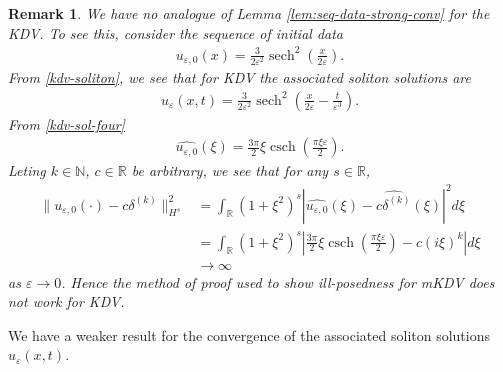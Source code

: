\documentclass[12pt,reqno]{amsart}
\numberwithin{equation}{section}  %
\newcommand{\rr}{\mathbb{R}}
\newcommand{\wh}{\widehat}
\newcommand{\ee}{\varepsilon}
\DeclareMathOperator{\sech}{sech}
\DeclareMathOperator{\csch}{csch}
\newtheorem{remark}[theorem]{Remark}
\begin{document}
\begin{framed}
  \begin{remark}
    We have no analogue of Lemma \ref{lem:seq-data-strong-conv} for the KDV. To
    see this, consider the sequence of initial data 
    \begin{equation*}
    \begin{split}
      u_{\ee,0}(x) = \frac{3}{2\ee^{2}}\sech^{2}\left(
      \frac{x}{2 \ee} \right).
    \end{split}
    \end{equation*}
    From \eqref{kdv-soliton}, we see that for KDV the associated soliton
    solutions are
    \begin{equation*}
    \begin{split}
      u_{\ee}(x,t) = \frac{3}{2\ee^{2}}
      \sech^{2}\left( \frac{x}{2 \ee} - \frac{t}{\ee^{3}}
        \right).
    \end{split}
    \end{equation*}
    From \eqref{kdv-sol-four}
    \begin{equation*}
    \begin{split}
      \wh{u_{\ee, 0}}(\xi) = \frac{3 \pi}{2} \xi \csch\left( \frac{\pi \xi
      \ee}{2} \right).
    \end{split}
    \end{equation*}
    Leting
    $k \in \mathbb{N}$, $c \in \rr$ be arbitrary, we see that for any $s \in \rr$,
    \begin{equation*}
    \begin{split}
      \| u_{\ee,0}(\cdot) - c \delta^{(k)} \|_{H^{s}}^{2}
      & = \int_{\rr}
      (1 + \xi^{2})^{s} | \wh{u_{\ee,0}}(\xi) - \wh{c \delta^{(k)}}(\xi)
      |^{2} d \xi
      \\
      & =  \int_{\rr} (1 + \xi^{2})^{s} | \frac{3 \pi}{2} \xi \csch\left(
      \frac{\pi \xi \ee}{2} \right) - c(i \xi)^{k}
       | d \xi
       \\
       & \to \infty 
    \end{split}
    \end{equation*}
    as $\ee \to 0$.
    Hence the method of proof used to show ill-posedness for
    mKDV does not work for KDV. 
    
    \end{remark}
  \end{framed}
          We have a weaker result for the convergence of the associated soliton
          solutions $u_{\ee}(x,t)$.
\end{document}

